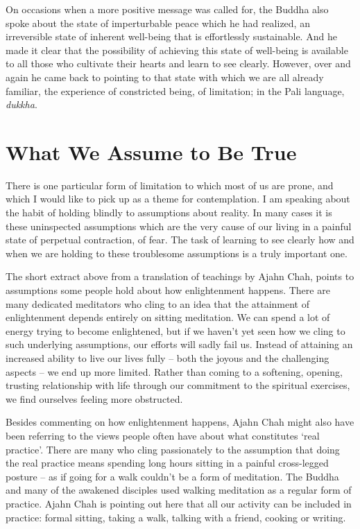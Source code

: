 On occasions when a more positive message was called for, the Buddha
also spoke about the state of imperturbable peace which he had realized,
an irreversible state of inherent well-being that is effortlessly
sustainable. And he made it clear that the possibility of achieving this
state of well-being is available to all those who cultivate their hearts
and learn to see clearly. However, over and again he came back to
pointing to that state with which we are all already familiar, the
experience of constricted being, of limitation; in the Pali language,
\emph{dukkha}.

\section{What We Assume to Be True}

There is one particular form of limitation to which most of us are
prone, and which I would like to pick up as a theme for contemplation. I
am speaking about the habit of holding blindly to assumptions about
reality. In many cases it is these uninspected assumptions which are the
very cause of our living in a painful state of perpetual contraction, of
fear. The task of learning to see clearly how and when we are holding to
these troublesome assumptions is a truly important one.

The short extract above from a translation of teachings by Ajahn Chah,
points to assumptions some people hold about how enlightenment happens.
There are many dedicated meditators who cling to an idea that the
attainment of enlightenment depends entirely on sitting meditation. We
can spend a lot of energy trying to become enlightened, but if we
haven’t yet seen how we cling to such underlying assumptions, our
efforts will sadly fail us. Instead of attaining an increased ability to
live our lives fully – both the joyous and the challenging aspects – we
end up more limited. Rather than coming to a softening, opening,
trusting relationship with life through our commitment to the spiritual
exercises, we find ourselves feeling more obstructed.

Besides commenting on how enlightenment happens, Ajahn Chah might also
have been referring to the views people often have about what
constitutes ‘real practice’. There are many who cling passionately to
the assumption that doing the real practice means spending long hours
sitting in a painful cross-legged posture – as if going for a walk
couldn’t be a form of meditation. The Buddha and many of the awakened
disciples used walking meditation as a regular form of practice. Ajahn
Chah is pointing out here that all our activity can be included in
practice: formal sitting, taking a walk, talking with a friend, cooking
or writing.

